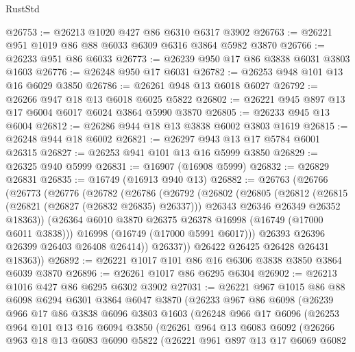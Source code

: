 \begin{lexlean}{RustStd}
\begin{coremodule}
@26753 := @26213 @1020 @427 @86 @6310 @6317 @3902
@26763 := @26221 @951 @1019 @86 @88 @6033 @6309 @6316 @3864 @5982 @3870
@26766 := @26233 @951 @86 @6033
@26773 := @26239 @950 @17 @86 @3838 @6031 @3803 @1603
@26776 := @26248 @950 @17 @6031
@26782 := @26253 @948 @101 @13 @16 @6029 @3850
@26786 := @26261 @948 @13 @6018 @6027
@26792 := @26266 @947 @18 @13 @6018 @6025 @5822
@26802 := @26221 @945 @897 @13 @17 @6004 @6017 @6024 @3864 @5990 @3870
@26805 := @26233 @945 @13 @6004
@26812 := @26286 @944 @18 @13 @3838 @6002 @3803 @1619
@26815 := @26248 @944 @18 @6002
@26821 := @26297 @943 @13 @17 @5784 @6001 @26315
@26827 := @26253 @941 @101 @13 @16 @5999 @3850
@26829 := @26325 @940 @5999
@26831 := @16907 (@16908 @5999)
@26832 := @26829 @26831
@26835 := @16749 (@16913 @940 @13)
@26882 := @26763
    (@26766
      (@26773
        (@26776
          (@26782
            (@26786
              (@26792
                (@26802
                  (@26805
                    (@26812
                      (@26815 (@26821 (@26827 (@26832 @26835) @26337)))
                      @26343
                      @26346
                      @26349
                      @26352
                      @18363))
                  (@26364 @6010 @3870 @26375 @26378 @16998 (@16749 (@17000 @6011 @3838)))
                  @16998
                  (@16749 (@17000 @5991 @6017)))
                @26393
                @26396
                @26399
                @26403
                @26408
                @26414))
            @26337))
        @26422
        @26425
        @26428
        @26431
        @18363))
@26892 := @26221 @1017 @101 @86 @16 @6306 @3838 @3850 @3864 @6039 @3870
@26896 := @26261 @1017 @86 @6295 @6304
@26902 := @26213 @1016 @427 @86 @6295 @6302 @3902
@27031 := @26221
    @967
    @1015
    @86
    @88
    @6098
    @6294
    @6301
    @3864
    @6047
    @3870
    (@26233
      @967
      @86
      @6098
      (@26239
        @966
        @17
        @86
        @3838
        @6096
        @3803
        @1603
        (@26248
          @966
          @17
          @6096
          (@26253
            @964
            @101
            @13
            @16
            @6094
            @3850
            (@26261
              @964
              @13
              @6083
              @6092
              (@26266
                @963
                @18
                @13
                @6083
                @6090
                @5822
                (@26221
                  @961
                  @897
                  @13
                  @17
                  @6069
                  @6082

\end{coremodule}
\end{lexlean}
